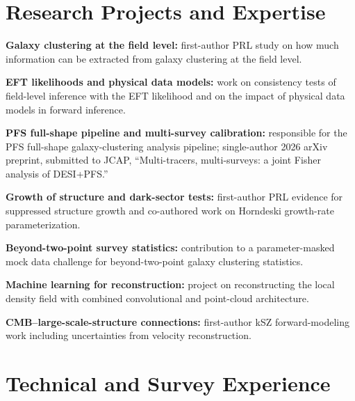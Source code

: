\section*{Research Projects and Expertise}
\begin{tightitemize}
  \item \textbf{Galaxy clustering at the field level:} first-author PRL study on how much information can be extracted from galaxy clustering at the field level.
  \item \textbf{EFT likelihoods and physical data models:} work on consistency tests of field-level inference with the EFT likelihood and on the impact of physical data models in forward inference.
  \item \textbf{PFS full-shape pipeline and multi-survey calibration:} responsible for the PFS full-shape galaxy-clustering analysis pipeline; single-author 2026 arXiv preprint, submitted to JCAP, ``Multi-tracers, multi-surveys: a joint Fisher analysis of DESI+PFS.''
  \item \textbf{Growth of structure and dark-sector tests:} first-author PRL evidence for suppressed structure growth and co-authored work on Horndeski growth-rate parameterization.
  \item \textbf{Beyond-two-point survey statistics:} contribution to a parameter-masked mock data challenge for beyond-two-point galaxy clustering statistics.
  \item \textbf{Machine learning for reconstruction:} project on reconstructing the local density field with combined convolutional and point-cloud architecture.
  \item \textbf{CMB--large-scale-structure connections:} first-author kSZ forward-modeling work including uncertainties from velocity reconstruction.
\end{tightitemize}

\section*{Technical and Survey Experience}

